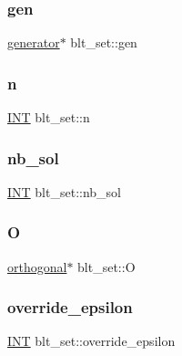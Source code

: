 \subsubsection{\texorpdfstring{gen}{gen}}
{\footnotesize\ttfamily \mbox{\hyperlink{classgenerator}{generator}}$\ast$ blt\+\_\+set\+::gen}

\mbox{\label{classblt__set_acad6eb1665cabc8041a3bb09e8e4b755}} 
\subsubsection{\texorpdfstring{n}{n}}
{\footnotesize\ttfamily \mbox{\hyperlink{galois_8h_a09fddde158a3a20bd2dcadb609de11dc}{I\+NT}} blt\+\_\+set\+::n}

\mbox{\label{classblt__set_a5844cc70e8d9392d23cbf1ffba4ba96b}} 
\subsubsection{\texorpdfstring{nb\+\_\+sol}{nb\_sol}}
{\footnotesize\ttfamily \mbox{\hyperlink{galois_8h_a09fddde158a3a20bd2dcadb609de11dc}{I\+NT}} blt\+\_\+set\+::nb\+\_\+sol}

\mbox{\label{classblt__set_a0c9b1196b7d692bc66ec915364ec2567}} 
\subsubsection{\texorpdfstring{O}{O}}
{\footnotesize\ttfamily \mbox{\hyperlink{classorthogonal}{orthogonal}}$\ast$ blt\+\_\+set\+::O}

\mbox{\label{classblt__set_a139e0c97977f8df224cbec3a8b4a690e}} 
\subsubsection{\texorpdfstring{override\+\_\+epsilon}{override\_epsilon}}
{\footnotesize\ttfamily \mbox{\hyperlink{galois_8h_a09fddde158a3a20bd2dcadb609de11dc}{I\+NT}} blt\+\_\+set\+::override\+\_\+epsilon}

